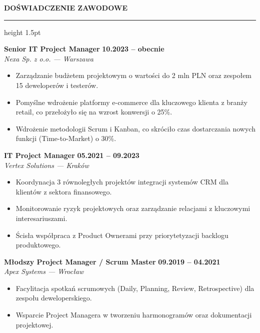 \documentclass[10pt, a4paper]{article}
\newcommand{\cvsection}[1]{%
  \vspace{12pt}%
  {\color{primary}\large\bfseries\MakeUppercase{#1}}%
  \vspace{3pt}%
  {{\color{accent}\hrule height 1.5pt}}%
  \vspace{8pt}%
}
\begin{document}
\hfill
\begin{minipage}[t]{0.67\textwidth}
  \vspace{0pt}
  
  \cvsection{Doświadczenie zawodowe}
  
  \textbf{Senior IT Project Manager} \hfill {\color{accent}\textbf{10.2023 -- obecnie}} \\
  {\color{primary}\textit{Nexa Sp. z o.o. --- Warszawa}}
  \begin{itemize}[leftmargin=*, noitemsep, topsep=2pt, label={\color{accent}\scriptsize$\bullet$}]
    \item Zarządzanie budżetem projektowym o wartości do 2 mln PLN oraz zespołem 15 deweloperów i testerów.
    \item Pomyślne wdrożenie platformy e-commerce dla kluczowego klienta z branży retail, co przełożyło się na wzrost konwersji o 25\%.
    \item Wdrożenie metodologii Scrum i Kanban, co skróciło czas dostarczania nowych funkcji (Time-to-Market) o 30\%.
  \end{itemize}
  \vspace{8pt}

  \textbf{IT Project Manager} \hfill {\color{accent}\textbf{05.2021 -- 09.2023}} \\
  {\color{primary}\textit{Vertex Solutions --- Kraków}}
  \begin{itemize}[leftmargin=*, noitemsep, topsep=2pt, label={\color{accent}\scriptsize$\bullet$}]
    \item Koordynacja 3 równoległych projektów integracji systemów CRM dla klientów z sektora finansowego.
    \item Monitorowanie ryzyk projektowych oraz zarządzanie relacjami z kluczowymi interesariuszami.
    \item Ścisła współpraca z Product Ownerami przy priorytetyzacji backlogu produktowego.
  \end{itemize}
  \vspace{8pt}

  \textbf{Młodszy Project Manager / Scrum Master} \hfill {\color{accent}\textbf{09.2019 -- 04.2021}} \\
  {\color{primary}\textit{Apex Systems --- Wrocław}}
  \begin{itemize}[leftmargin=*, noitemsep, topsep=2pt, label={\color{accent}\scriptsize$\bullet$}]
    \item Facylitacja spotkań scrumowych (Daily, Planning, Review, Retrospective) dla zespołu deweloperskiego.
    \item Wsparcie Project Managera w tworzeniu harmonogramów oraz dokumentacji projektowej.
  \end{itemize}
  

\end{minipage}
\end{document}
